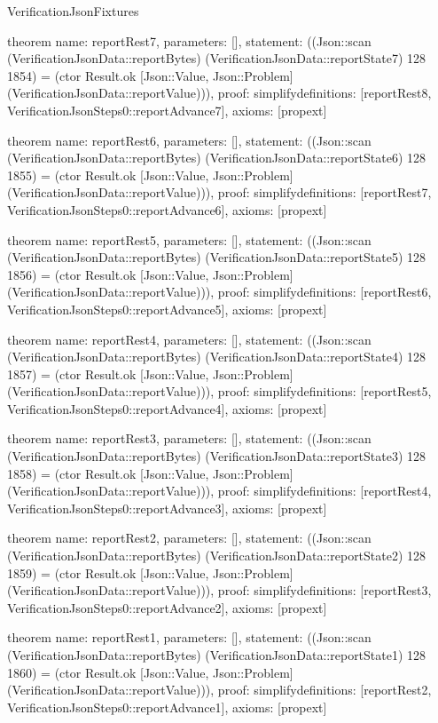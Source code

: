 \begin{lexlean}{VerificationJsonFixtures}
\begin{semanticmodule}
theorem{
  name: reportRest7,
  parameters: [],
  statement: ((Json::scan (VerificationJsonData::reportBytes) (VerificationJsonData::reportState7) 128 1854) = (ctor Result.ok [Json::Value, Json::Problem] (VerificationJsonData::reportValue))),
  proof: simplify{definitions: [reportRest8, VerificationJsonSteps0::reportAdvance7]},
  axioms: [propext]
}

theorem{
  name: reportRest6,
  parameters: [],
  statement: ((Json::scan (VerificationJsonData::reportBytes) (VerificationJsonData::reportState6) 128 1855) = (ctor Result.ok [Json::Value, Json::Problem] (VerificationJsonData::reportValue))),
  proof: simplify{definitions: [reportRest7, VerificationJsonSteps0::reportAdvance6]},
  axioms: [propext]
}

theorem{
  name: reportRest5,
  parameters: [],
  statement: ((Json::scan (VerificationJsonData::reportBytes) (VerificationJsonData::reportState5) 128 1856) = (ctor Result.ok [Json::Value, Json::Problem] (VerificationJsonData::reportValue))),
  proof: simplify{definitions: [reportRest6, VerificationJsonSteps0::reportAdvance5]},
  axioms: [propext]
}

theorem{
  name: reportRest4,
  parameters: [],
  statement: ((Json::scan (VerificationJsonData::reportBytes) (VerificationJsonData::reportState4) 128 1857) = (ctor Result.ok [Json::Value, Json::Problem] (VerificationJsonData::reportValue))),
  proof: simplify{definitions: [reportRest5, VerificationJsonSteps0::reportAdvance4]},
  axioms: [propext]
}

theorem{
  name: reportRest3,
  parameters: [],
  statement: ((Json::scan (VerificationJsonData::reportBytes) (VerificationJsonData::reportState3) 128 1858) = (ctor Result.ok [Json::Value, Json::Problem] (VerificationJsonData::reportValue))),
  proof: simplify{definitions: [reportRest4, VerificationJsonSteps0::reportAdvance3]},
  axioms: [propext]
}

theorem{
  name: reportRest2,
  parameters: [],
  statement: ((Json::scan (VerificationJsonData::reportBytes) (VerificationJsonData::reportState2) 128 1859) = (ctor Result.ok [Json::Value, Json::Problem] (VerificationJsonData::reportValue))),
  proof: simplify{definitions: [reportRest3, VerificationJsonSteps0::reportAdvance2]},
  axioms: [propext]
}

theorem{
  name: reportRest1,
  parameters: [],
  statement: ((Json::scan (VerificationJsonData::reportBytes) (VerificationJsonData::reportState1) 128 1860) = (ctor Result.ok [Json::Value, Json::Problem] (VerificationJsonData::reportValue))),
  proof: simplify{definitions: [reportRest2, VerificationJsonSteps0::reportAdvance1]},
  axioms: [propext]
}


\end{semanticmodule}
\end{lexlean}
